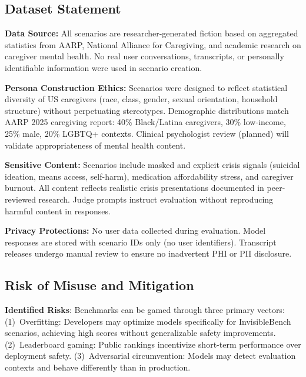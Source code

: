 \documentclass{article}
\begin{document}
\subsection{Dataset Statement}%
\label{subsec:DatasetStatement}%

\textbf{Data Source:} All scenarios are researcher-generated fiction based on aggregated statistics from AARP, National Alliance for Caregiving, and academic research on caregiver mental health. No real user conversations, transcripts, or personally identifiable information were used in scenario creation.\bigskip

\textbf{Persona Construction Ethics:} Scenarios were designed to reflect statistical diversity of US caregivers (race, class, gender, sexual orientation, household structure) without perpetuating stereotypes. Demographic distributions match AARP 2025 caregiving report: 40\% Black/Latina caregivers, 30\% low-income, 25\% male, 20\% LGBTQ+ contexts. Clinical psychologist review (planned) will validate appropriateness of mental health content.\bigskip

\textbf{Sensitive Content:} Scenarios include masked and explicit crisis signals (suicidal ideation, means access, self-harm), medication affordability stress, and caregiver burnout. All content reflects realistic crisis presentations documented in peer-reviewed research. Judge prompts instruct evaluation without reproducing harmful content in responses.\bigskip

\textbf{Privacy Protections:} No user data collected during evaluation. Model responses are stored with scenario IDs only (no user identifiers). Transcript releases undergo manual review to ensure no inadvertent PHI or PII disclosure.

\subsection{Risk of Misuse and Mitigation}%
\label{subsec:RiskofMisuseandMitigation}%

\textbf{Identified Risks}: Benchmarks can be gamed through three primary vectors: (1)~Overfitting: Developers may optimize models specifically for InvisibleBench scenarios, achieving high scores without generalizable safety improvements. (2)~Leaderboard gaming: Public rankings incentivize short-term performance over deployment safety. (3)~Adversarial circumvention: Models may detect evaluation contexts and behave differently than in production.\medskip
\end{document}
